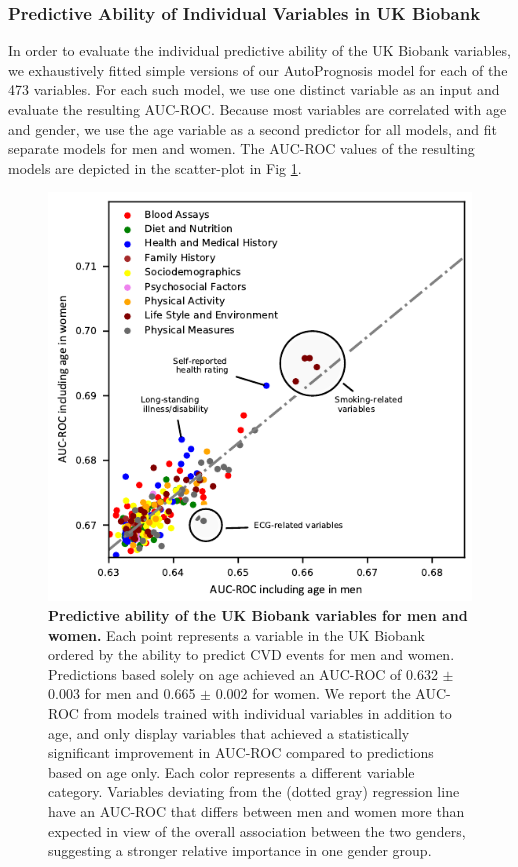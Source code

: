\documentclass [PhD] {uclathes}
\begin{document}
\subsubsection*{Predictive Ability of Individual Variables in UK Biobank} 
In order to evaluate the individual predictive ability of the UK Biobank variables, we exhaustively fitted simple versions of our AutoPrognosis model for each of the 473 variables. For each such model, we use one distinct variable as an input and evaluate the resulting AUC-ROC. Because most variables are correlated with age and gender, we use the age variable as a second predictor for all models, and fit separate models for men and women. The AUC-ROC values of the resulting models are depicted in the scatter-plot in Fig \ref{ch7fig1}.    

\begin{figure}[t]
\centering
\includegraphics[width=5in]{ch7Fig1.pdf}
\caption{{\bf Predictive ability of the UK Biobank variables for men and women.} Each point represents a variable in the UK Biobank ordered by the ability to predict CVD events for men and women. Predictions based solely on age achieved an AUC-ROC of 0.632 $\pm$ 0.003 for men and 0.665 $\pm$ 0.002 for women. We report the AUC-ROC from models trained with individual variables in addition to age, and only display variables that achieved a statistically significant improvement in AUC-ROC compared to predictions based on age only. Each color represents a different variable category. Variables deviating from the (dotted gray) regression line have an AUC-ROC that differs between men and women more than expected in view of the overall association between the two genders, suggesting a stronger relative importance in one gender group.}
\label{ch7fig1}
\end{figure}
\end{document}

